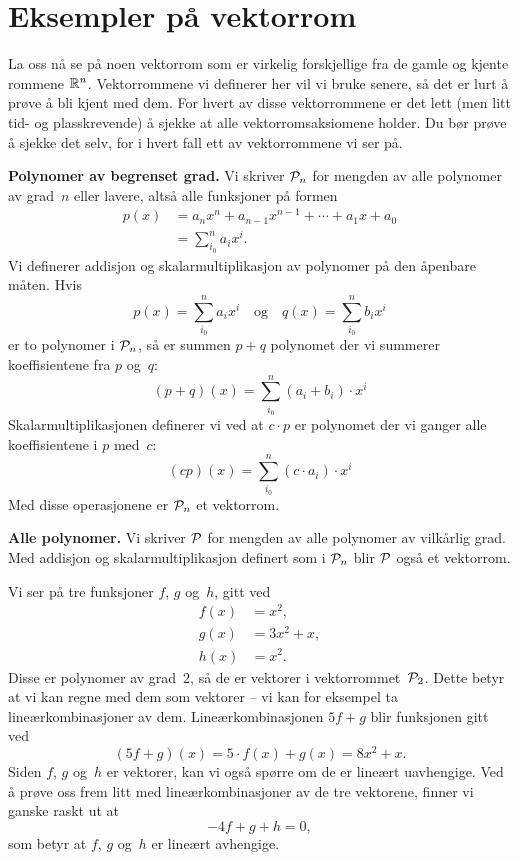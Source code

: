 \section*{Eksempler på vektorrom}

La oss nå se på noen vektorrom som er virkelig forskjellige fra de
gamle og kjente rommene $\R^n$.  Vektorrommene vi definerer her vil vi
bruke senere, så det er lurt å prøve å bli kjent med dem.  For hvert
av disse vektorrommene er det lett (men litt tid- og plasskrevende) å
sjekke at alle vektorromsaksiomene holder.  Du bør prøve å sjekke det
selv, for i hvert fall ett av vektorrommene vi ser på.

\medskip\noindent\textbf{Polynomer av begrenset grad. }%
Vi skriver $\P_n$ for mengden av alle polynomer av grad~$n$ eller
lavere, altså alle funksjoner på formen
\begin{align*}
p(x)
&= a_n x^n + a_{n-1} x^{n-1} + \cdots + a_1 x + a_0 \\
&= \sum_{i_0}^n a_i x^i.
\end{align*}
Vi definerer addisjon og skalarmultiplikasjon av polynomer på den
åpenbare måten.  Hvis
\[
p(x) = \sum_{i_0}^n a_i x^i
\quad\text{og}\quad
q(x) = \sum_{i_0}^n b_i x^i
\]
er to polynomer i $\P_n$, så er summen $p + q$ polynomet der vi
summerer koeffisientene fra $p$ og~$q$:
\[
(p + q)(x) = \sum_{i_0}^n (a_i + b_i) \cdot x^i
\]
Skalarmultiplikasjonen definerer vi ved at $c \cdot p$ er polynomet
der vi ganger alle koeffisientene i $p$ med~$c$:
\[
(cp)(x) = \sum_{i_0}^n (c \cdot a_i) \cdot x^i
\]
Med disse operasjonene er $\P_n$ et vektorrom.

\medskip\noindent\textbf{Alle polynomer. }%
Vi skriver $\P$ for mengden av alle polynomer av vilkårlig grad.  Med
addisjon og skalarmultiplikasjon definert som i $\P_n$ blir $\P$ også
et vektorrom.

\begin{ex}
Vi ser på tre funksjoner $f$, $g$ og~$h$, gitt ved
\begin{align*}
f(x) &= x^2, \\
g(x) &= 3x^2 + x, \\
h(x) &= x^2.
\end{align*}
Disse er polynomer av grad~$2$, så de er vektorer i
vektorrommet~$\P_2$.  Dette betyr at vi kan regne med dem som vektorer
-- vi kan for eksempel ta lineærkombinasjoner av dem.
Lineærkombinasjonen $5f + g$ blir funksjonen gitt ved
\[
(5f + g)(x) = 5 \cdot f(x) + g(x) = 8x^2 + x.
\]
Siden $f$, $g$ og~$h$ er vektorer, kan vi også spørre om de er lineært
uavhengige.  Ved å prøve oss frem litt med lineærkombinasjoner av de
tre vektorene, finner vi ganske raskt ut at
\[
-4f + g + h = 0,
\]
som betyr at $f$, $g$ og~$h$ er lineært avhengige.
\end{ex}

